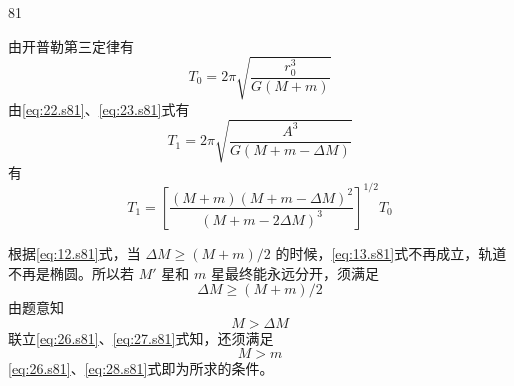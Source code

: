 \begin{solution}{81}
\begin{subsolution}
\begin{subsubsolution}
            由开普勒第三定律有
            \begin{equation}
                T_{0} = 2\pi \sqrt{\frac{r_{0}^{3}}{G(M+m)}}
                \label{eq:23.s81}
            \end{equation}
            由\eqref{eq:22.s81}、\eqref{eq:23.s81}式有
            \begin{equation}
                T_{1} = 2\pi \sqrt{\frac{A^{3}}{G(M+m-\Delta M)}}
                \label{eq:24.s81}
            \end{equation}
            有
            \begin{equation}
                T_{1} = \left[ \frac{(M+m)(M+m-\Delta M)^{2}}{(M+m-2\Delta M)^{3}} \right]^{1/2} T_{0}
                \label{eq:25.s81}
            \end{equation}
        \end{subsubsolution}
        \begin{subsubsolution}
            根据\eqref{eq:12.s81}式，当 $\Delta M \geq (M+m)/2$ 的时候，\eqref{eq:13.s81}式不再成立，轨道不再是椭圆。所以若 $M'$ 星和 $m$ 星最终能永远分开，须满足
            \begin{equation}
                \Delta M \geq (M+m)/2
                \label{eq:26.s81}
            \end{equation}
            由题意知
            \begin{equation}
                M > \Delta M
                \label{eq:27.s81}
            \end{equation}
            联立\eqref{eq:26.s81}、\eqref{eq:27.s81}式知，还须满足
            \begin{equation}
                M > m
                \label{eq:28.s81}
            \end{equation}
            \eqref{eq:26.s81}、\eqref{eq:28.s81}式即为所求的条件。
        \end{subsubsolution}
    \end{subsolution}
\end{solution}